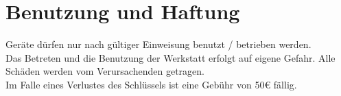 \documentclass[a4paper]{article}
\begin{document}
\section*{Benutzung und Haftung}
Geräte dürfen nur nach gültiger Einweisung benutzt / betrieben werden.\\
Das Betreten und die Benutzung der Werkstatt erfolgt auf eigene Gefahr. Alle Schäden werden vom Verursachenden getragen.\\
Im Falle eines Verlustes des Schlüssels ist eine Gebühr von 50€ fällig.
\vspace{1cm}\\
\noindent
\underline{\hspace{3cm}}\hspace{1cm} \underline{\hspace{3cm}}\\\\\\
\noindent
\underline{\hspace{3cm}}\hspace{1cm} \underline{\hspace{3cm}}\\\\\\
\end{document}
